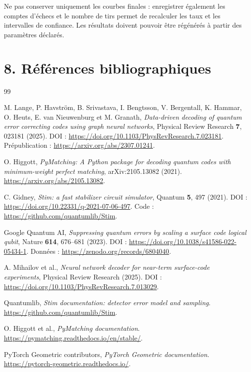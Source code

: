 \documentclass[11pt,a4paper]{article}
\begin{document}
Ne pas conserver uniquement les courbes finales : enregistrer également
les comptes d'échecs et le nombre de tirs permet de recalculer les taux et
les intervalles de confiance. Les résultats doivent pouvoir être régénérés
à partir des paramètres déclarés.

\section{8. Références bibliographiques}

\begin{thebibliography}{99}

M. Lange, P. Havström, B. Srivastava, I. Bengtsson, V. Bergentall,
K. Hammar, O. Heuts, E. van Nieuwenburg et M. Granath,
\emph{Data-driven decoding of quantum error correcting codes using graph
neural networks}, Physical Review Research \textbf{7}, 023181 (2025).
DOI : \url{https://doi.org/10.1103/PhysRevResearch.7.023181}.
Prépublication : \url{https://arxiv.org/abs/2307.01241}.

O. Higgott, \emph{PyMatching: A Python package for decoding quantum codes
with minimum-weight perfect matching}, arXiv:2105.13082 (2021).
\url{https://arxiv.org/abs/2105.13082}.

C. Gidney, \emph{Stim: a fast stabilizer circuit simulator},
Quantum \textbf{5}, 497 (2021).
DOI : \url{https://doi.org/10.22331/q-2021-07-06-497}.
Code : \url{https://github.com/quantumlib/Stim}.

Google Quantum AI, \emph{Suppressing quantum errors by scaling a surface
code logical qubit}, Nature \textbf{614}, 676--681 (2023).
DOI : \url{https://doi.org/10.1038/s41586-022-05434-1}.
Données : \url{https://zenodo.org/records/6804040}.

A. Mihailov et al., \emph{Neural network decoder for near-term surface-code
experiments}, Physical Review Research (2025).
DOI : \url{https://doi.org/10.1103/PhysRevResearch.7.013029}.

Quantumlib, \emph{Stim documentation: detector error model and sampling}.
\url{https://github.com/quantumlib/Stim}.

O. Higgott et al., \emph{PyMatching documentation}.
\url{https://pymatching.readthedocs.io/en/stable/}.

PyTorch Geometric contributors, \emph{PyTorch Geometric documentation}.
\url{https://pytorch-geometric.readthedocs.io/}.

\end{thebibliography}
\end{document}
